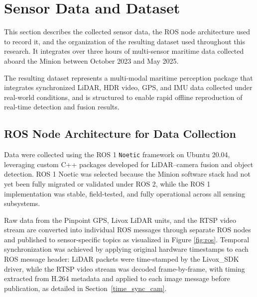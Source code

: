 \documentclass[../main.tex]{subfiles}
\begin{document}
\section{Sensor Data and Dataset}
\label{sec:sensor_data_dataset}


This section describes the collected sensor data, the ROS node architecture used to record it, 
and the organization of the resulting dataset used throughout this research.  
It integrates over three hours of multi-sensor maritime data collected aboard the Minion between October 2023 and May 2025.

The resulting dataset represents a multi-modal maritime perception package that integrates synchronized LiDAR, HDR video, GPS, and IMU data collected under real-world conditions, and is structured to enable rapid offline reproduction of real-time detection and fusion results.


\subsection{ROS Node Architecture for Data Collection}
\label{sec:ros_architecture}

Data were collected using the ROS 1 \texttt{Noetic} framework on Ubuntu 20.04, 
leveraging custom C++ packages developed for LiDAR–camera fusion and object detection.  
ROS 1 Noetic was selected because the Minion software stack had not yet been fully migrated or validated under ROS 2, while the ROS 1 implementation was stable, field-tested, and fully operational across all sensing subsystems.

Raw data from the Pinpoint GPS, Livox LiDAR units, and the RTSP video stream are converted into individual ROS messages through separate ROS nodes and published to sensor-specific topics as visualized in Figure \ref{fig:ros}.  
Temporal synchronization was achieved by applying original hardware timestamps to each ROS message header: LiDAR packets were time-stamped by the Livox\_SDK driver, while the RTSP video stream was decoded frame-by-frame, with timing extracted from H.264 metadata and applied to each image message before publication, as detailed in Section~\ref{time_sync_cam}.
\end{document}
